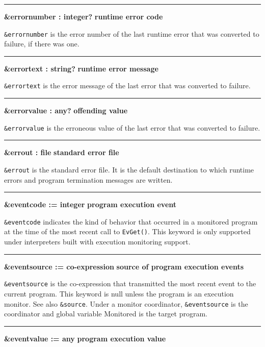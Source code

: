 \bigskip\hrule\vspace{0.1cm}
\noindent
{\bf \&errornumber : integer? } \hfill {\bf runtime error code}

\noindent
\texttt{\&errornumber} is the error number of the last runtime error
that was converted to failure, if there was one.

\bigskip\hrule\vspace{0.1cm}
\noindent
{\bf \&errortext : string? } \hfill {\bf runtime error message}

\noindent
{}\texttt{\&errortext} is the error
message of the last error that was converted to failure.

\bigskip\hrule\vspace{0.1cm}
\noindent
{\bf \&errorvalue : any? } \hfill {\bf offending value}

\noindent
\texttt{\&errorvalue} is the erroneous value of the last error that was
converted to failure.

\bigskip\hrule\vspace{0.1cm}
\noindent
{\bf \&errout : file } \hfill {\bf standard error file}

\noindent
{}\texttt{\&errout} is the standard
error file. It is the default destination to which runtime errors and
program termination messages are written.

\bigskip\hrule\vspace{0.1cm}
\noindent
{\bf \&eventcode := integer } \hfill {\bf program execution event}

\noindent
{}\texttt{\&eventcode} indicates the
kind of behavior that occurred in a monitored program at the time of
the most recent call to \texttt{EvGet()}. This keyword is only
supported under interpreters built with execution monitoring support.

\bigskip\hrule\vspace{0.1cm}
\noindent
{\bf \&eventsource := co{}-expression } \hfill {\bf source of program execution events}

\noindent
\texttt{\&eventsource} is the co-expression that transmitted the most
recent event to the current program. This keyword is null unless the
program is an execution monitor. See also \texttt{\&source}. Under a
monitor coordinator, \texttt{\&eventsource} is the coordinator and
global variable Monitored is the target program.

\bigskip\hrule\vspace{0.1cm}
\noindent
{\bf \&eventvalue := any } \hfill {\bf program execution value}

